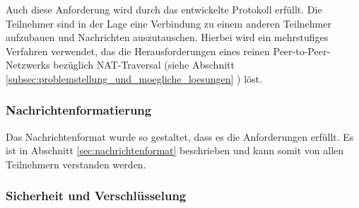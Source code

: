 Auch diese Anforderung wird durch das entwickelte Protokoll erfüllt. Die Teilnehmer sind in der Lage eine Verbindung zu einem anderen Teilnehmer aufzubauen und Nachrichten auszutauschen. Hierbei wird ein mehrstufiges Verfahren verwendet, das die Herausforderungen eines reinen Peer-to-Peer-Netzwerks bezüglich NAT-Traversal (siehe Abschnitt \ref{subsec:problemstellung_und_moegliche_loesungen} \textit{}) löst.


\subsubsection{Nachrichtenformatierung}

Das Nachrichtenformat wurde so gestaltet, dass es die Anforderungen erfüllt. Es ist in Abschnitt \ref{sec:nachrichtenformat} \textit{} beschrieben und kann somit von allen Teilnehmern verstanden werden.


\subsubsection{Sicherheit und Verschlüsselung}


